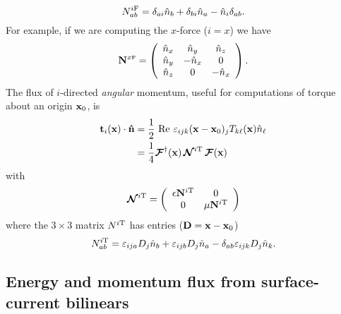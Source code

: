 \documentclass[letterpaper]{article}
\newcommand{\IF}{^{i\text{\scriptsize F}}}
\newcommand{\IT}{^{i\text{\scriptsize T}}}
\begin{document}
$$ N\IF_{ab} = 
   \delta_{ai} \hat{n}_b + \delta_{bi} \hat{n}_a
  - \hat{n}_i \delta_{ab}.
$$
For example, if we are computing the $x$-force ($i=x$)
we have 
$$ \mathbf{N}^{x\text{\tiny F}}=\left(\begin{array}{ccc}
   \hat{n}_x & \hat n_y   & \hat n_z \\
   \hat{n}_y & -\hat{n}_x & 0 \\
   \hat{n}_z & 0          & -\hat{n}_x
  \end{array}\right).
$$
The flux of $i$-directed \textit{angular} momentum, useful
for computations of torque about an origin $\mathbf{x}_0$, is
\begin{align}
 \vb t_{i}(\vb x) \cdot \vbhat{n}
&=\frac{1}{2}
  \text{ Re }
  \varepsilon_{ijk}(\vb x-\vb x_0)_j T_{k\ell}(\vb x) \hat{n}_\ell
\\
&= \frac{1}{4}\bmc{F}^\dagger(\vb x) 
   \, \bmc{N}\IT \, \bmc{F}(\vb x)
\label{ITVMVP}
\end{align}
with 
$$
   \bmc N\IT=
   \left(\begin{array}{cc}
   \epsilon \vb N\IT & 0 \\
            0        & \mu \vb N\IT 
   \end{array}\right)
$$
where the $3\times 3$ matrix $N\IT$ has entries ($\mathbf{D}=\mathbf{x}-\mathbf{x}_0$)
$$ N\IT_{ab}=
   \varepsilon_{ija}D_j \hat{n}_b
  +\varepsilon_{ijb}D_j \hat{n}_a
  -\delta_{ab} \varepsilon_{ijk} D_j \hat{n}_k.
$$

\subsection*{Energy and momentum flux from surface-current bilinears}
\end{document}
